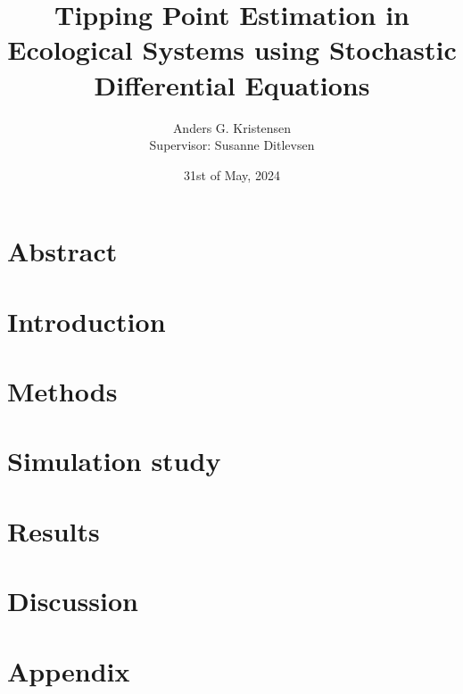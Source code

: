 \documentclass[11pt]{article}
\numberwithin{equation}{section}
\begin{document}
\pagestyle{fancy}
\fancyfoot{}
\fancyfoot[C]{\thepage}
\fancyhead[C]{}
\fancyhead[L]{}
\fancyhead[R]{}
\renewcommand{\headrulewidth}{0pt}
\renewcommand{\footrulewidth}{0pt}
\allowdisplaybreaks



\title{Tipping Point Estimation in Ecological Systems using Stochastic Differential Equations}
\author{Anders G. Kristensen \\
Supervisor: Susanne Ditlevsen}
\date{31st of May, 2024}
\maketitle
\section*{Abstract}\label{Abstract}

\newpage
\tableofcontents
\section{Introduction}\label{Introduction}

\section{Methods}\label{Methods}

\section{Simulation study}\label{Simulaton study}

\section{Results}\label{Results}

\section{Discussion}\label{Discussion}

\newpage

\newpage
\appendix
\section*{Appendix}\label{Appendix}

\end{document}

